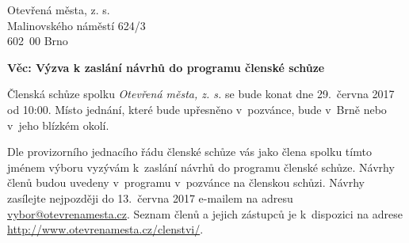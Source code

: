 \documentclass[a4paper,12pt]{letter}
\begin{document}
\pagestyle{empty}
\begin{letter}{}{}
\begin{flushleft}
Otevřená města, z. s.\\ Malinovského náměstí 624/3\\ 602\ 00 Brno
\end{flushleft}
\date{V Brně dne 29.\ května 2017}

\opening{\textbf{Věc: Výzva k zaslání návrhů do programu členské schůze}}

Členská schůze spolku \emph{Otevřená města, z. s.} se bude konat dne 29.\ června
2017 od 10:00. Místo jednání, které bude upřesněno v~pozvánce, bude v~Brně nebo
v~jeho blízkém okolí.

\sloppy
Dle provizorního jednacího řádu členské schůze vás jako člena spolku tímto
jménem výboru vyzývám k~zaslání návrhů do programu členské schůze. Návrhy členů
budou uvedeny v~programu v~pozvánce na členskou schůzi. Návrhy zasílejte
nejpozději do 13.\ června 2017 e-mailem na adresu
\href{mailto:vybor@otevrenamesta.cz}{vybor@otevrenamesta.cz}. Seznam členů
a jejich zástupců je k~dispozici na adrese
\href{http://www.otevrenamesta.cz/clenstvi/}{http://www.otevrenamesta.cz/clenstvi/}.

\fussy
\vspace{0.1\textwidth}
\begin{flushright}
\\
\\
\end{flushright}
\end{letter}
\end{document}

